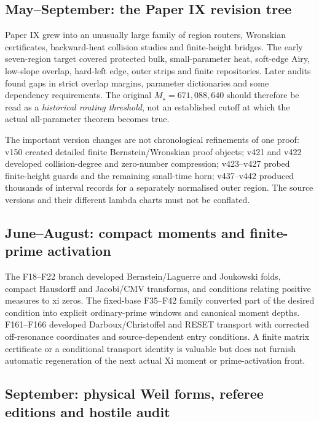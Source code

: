 \documentclass[
  10pt,
  a4paper,
  10pt,
  oneside,
  openany]{book}
\begin{document}
\subsection{May--September: the Paper IX revision
tree}\label{mayseptember-the-paper-ix-revision-tree}

Paper IX grew into an unusually large family of region routers,
Wronskian certificates, backward-heat collision studies and
finite-height bridges. The early seven-region target covered protected
bulk, small-parameter heat, soft-edge Airy, low-slope overlap, hard-left
edge, outer strips and finite repositories. Later audits found gaps in
strict overlap margins, parameter dictionaries and some dependency
requirements. The original \(M_\star=671{,}088{,}640\) should therefore
be read as a \emph{historical routing threshold}, not an established
cutoff at which the actual all-parameter theorem becomes true.

The important version changes are not chronological refinements of one
proof: v150 created detailed finite Bernstein/Wronskian proof objects;
v421 and v422 developed collision-degree and zero-number compression;
v423--v427 probed finite-height guards and the remaining small-time
horn; v437--v442 produced thousands of interval records for a separately
normalised outer region. The source versions and their different lambda
charts must not be conflated.

\subsection{June--August: compact moments and finite-prime
activation}\label{juneaugust-compact-moments-and-finite-prime-activation}

The F18--F22 branch developed Bernstein/Laguerre and Joukowski folds,
compact Hausdorff and Jacobi/CMV transforms, and conditions relating
positive measures to xi zeros. The fixed-base F35--F42 family converted
part of the desired condition into explicit ordinary-prime windows and
canonical moment depths. F161--F166 developed Darboux/Christoffel and
RESET transport with corrected off-resonance coordinates and
source-dependent entry conditions. A finite matrix certificate or a
conditional transport identity is valuable but does not furnish
automatic regeneration of the next actual Xi moment or prime-activation
front.

\subsection{September: physical Weil forms, referee editions and hostile
audit}\label{september-physical-weil-forms-referee-editions-and-hostile-audit}
\end{document}
